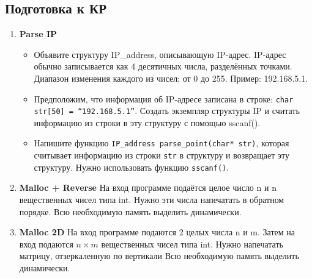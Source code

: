 \documentclass{article}
\begin{document}


\subsection*{Подготовка к КР}
\begin{enumerate}
\item \textbf{Parse IP}
\begin{itemize}
\item Объявите структуру IP\_address, описывающую IP-адрес. IP-адрес обычно записывается как 4 десятичных числа, разделённых точками. Диапазон изменения каждого из чисел: от 0 до 255. Пример: 192.168.5.1.
\item Предположим, что информация об IP-адресе записана в строке: \texttt{char str[50] = ``192.168.5.1''}. Создать экземпляр структуры IP и считать информацию из строки в эту структуру с помощью sscanf().
\item Напишите функцию \texttt{IP\_address parse\_point(char* str)}, которая считывает информацию из строки \texttt{str} в структуру и возвращает эту структуру. Нужно использовать функцию \texttt{sscanf()}.
\end{itemize}
\item \textbf{Malloc + Reverse} На вход программе подаётся целое число n и n вещественных чисел типа int. Нужно эти числа напечатать в обратном порядке. Всю необходимую память выделить динамически.
\item \textbf{Malloc 2D} На вход программе подаются 2 целых числа n и m. Затем на вход подаются $n \times m$ вещественных чисел типа int. Нужно напечатать матрицу, отзеркаленную по вертикали Всю необходимую память выделить динамически.
\end{enumerate}
\end{document}
